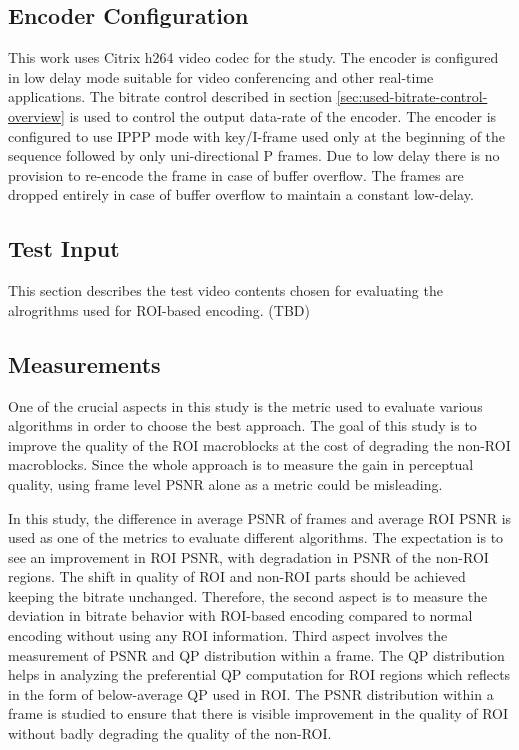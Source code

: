 \documentclass[11pt]{article} %
\begin{document}
\subsection{Encoder Configuration} \label {sec:Encoder configuration}     
This work uses Citrix h264 video codec for the study. The encoder is configured in low delay mode suitable for video conferencing and other real-time applications. The bitrate control described in section \ref{sec:used-bitrate-control-overview} is used to control the output data-rate of the encoder. The encoder is configured to use IPPP mode with key/I-frame used only at the beginning of the sequence followed by only uni-directional P frames. Due to low delay there is no provision to re-encode the frame in case of buffer overflow. The frames are dropped entirely in case of buffer overflow to maintain a constant low-delay.

\subsection{Test Input}
This section describes the test video contents chosen for evaluating the alrogrithms used for ROI-based encoding. (TBD)

\subsection{Measurements}
One of the crucial aspects in this study is the metric used to evaluate various algorithms in order to choose the best approach. The goal of this study is to improve the quality of the ROI macroblocks at the cost of degrading the non-ROI macroblocks. Since the whole approach is to measure the gain in perceptual quality, using frame level PSNR alone as a metric could be misleading. 

In this study, the difference in average PSNR of frames and average ROI PSNR is used as one of the metrics to evaluate different algorithms. The expectation is to see an improvement in ROI PSNR, with degradation in PSNR of the non-ROI regions. The shift in quality of ROI and non-ROI parts should be achieved keeping the bitrate unchanged. Therefore, the second aspect is to measure the deviation in bitrate behavior with ROI-based encoding compared to normal encoding without using any ROI information. Third aspect involves the measurement of PSNR and QP distribution within a frame. The QP distribution helps in analyzing the preferential QP computation for ROI regions which reflects in the form of below-average QP used in ROI. The PSNR distribution within a frame is studied to ensure that there is visible improvement in the quality of ROI without badly degrading the quality of the non-ROI. 
\end{document}
